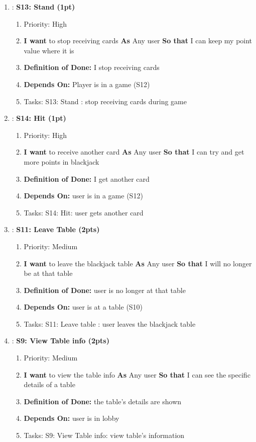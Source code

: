 \begin{enumerate}[nosep]
    \item: \textbf{S13: Stand (1pt)}
    \begin{enumerate}[nosep]
        \item Priority: High
        \item \textbf{I want} to stop receiving cards \textbf{As} Any user \textbf{So that} I can keep my point value where it is
        \item \textbf{Definition of Done:} I stop receiving cards
        \item \textbf{Depends On:} Player is in a game (S12)
        \item Tasks: S13: Stand : stop receiving cards during game
    \end{enumerate}

    \item: \textbf{S14: Hit (1pt)}
    \begin{enumerate}[nosep]
        \item Priority: High
        \item \textbf{I want} to receive another card \textbf{As} Any user \textbf{So that} I can try and get more points in blackjack 
        \item \textbf{Definition of Done:} I get another card
	\item \textbf{Depends On:} user is in a game (S12)
        \item Tasks: S14: Hit: user gets another card
    \end{enumerate}

     \item: \textbf{S11: Leave Table (2pts)}
    \begin{enumerate}[nosep]
        \item Priority: Medium
        \item \textbf{I want} to leave the blackjack table \textbf{As} Any user \textbf{So that} I will no longer be at that table
        \item \textbf{Definition of Done:} user is no longer at that table
        \item \textbf{Depends On:} user is at a table (S10)
        \item Tasks: S11: Leave table : user leaves the blackjack table
    \end{enumerate}

    \item: \textbf{S9: View Table info (2pts)}
    \begin{enumerate}[nosep]
        \item Priority: Medium
        \item \textbf{I want} to view the table info \textbf{As} Any user \textbf{So that} I can see the specific details of a table
        \item \textbf{Definition of Done:} the table's details are shown
        \item \textbf{Depends On:} user is in lobby
        \item Tasks: S9: View Table info: view table's information
    \end{enumerate}


\end{enumerate}

